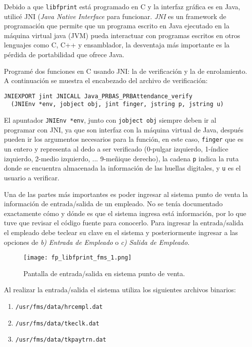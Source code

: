 Debido a que \texttt{libfprint} está programado en C y la interfaz gráfica es en Java, utilicé JNI (\textit{Java Native Interface} para funcionar. \textit{JNI} es un framework de programación que permite que un programa escrito en Java ejecutado en la máquina virtual java (JVM) pueda interactuar con programas escritos en otros lenguajes como C, C++ y ensamblador, la desventaja más importante es la pérdida de portabilidad que ofrece Java.

Programé dos funciones en C usando JNI: la de verificación y la de enrolamiento. A continuación se muestra el encabezado del archivo de verificación:

\begin{Verbatim}
JNIEXPORT jint JNICALL Java_PRBAS_PRBAttendance_verify
  (JNIEnv *env, jobject obj, jint finger, jstring p, jstring u)
\end{Verbatim}

El apuntador \texttt{JNIEnv *env}, junto con \texttt{jobject obj} siempre deben ir al programar con JNI, ya que son interfaz con la máquina virtual de Java, después pueden ir los argumentos necesarios para la función, en este caso, \texttt{finger} que es un entero y representa al dedo a ser verificado (0-pulgar izquierdo, 1-índice izquierdo, 2-medio izquierdo, ... 9-meñique derecho), la cadena \texttt{p} indica la ruta donde se encuentra almacenada la información de las huellas digitales, y \texttt{u} es el usuario a verificar.

Una de las partes más importantes es poder ingresar al sistema punto de venta la información de entrada/salida de un empleado. No se tenía documentado exactamente cómo y dónde es que el sistema ingresa está información, por lo que tuve que revisar el código fuente para conocerlo. Para ingresar la entrada/salida el empleado debe teclear su clave en el sistema y posteriormente ingresar a las opciones de \textit{b) Entrada de Empleado} o \textit{c) Salida de Empleado}.

\begin{figure}[htb]
 \begin{center}
  \texttt{[image: fp\_libfprint\_fms\_1.png]}
 \end{center}
 \caption{Pantalla de entrada/salida en sistema punto de venta.}
 \label{fig:finger_print_4}
\end{figure}

Al realizar la entrada/salida el sistema utiliza los siguientes archivos binarios: 

\begin{enumerate}
 \item \texttt{/usr/fms/data/hrcempl.dat}
 \item \texttt{/usr/fms/data/tkeclk.dat}
 \item \texttt{/usr/fms/data/tkpaytrn.dat}
\end{enumerate}


